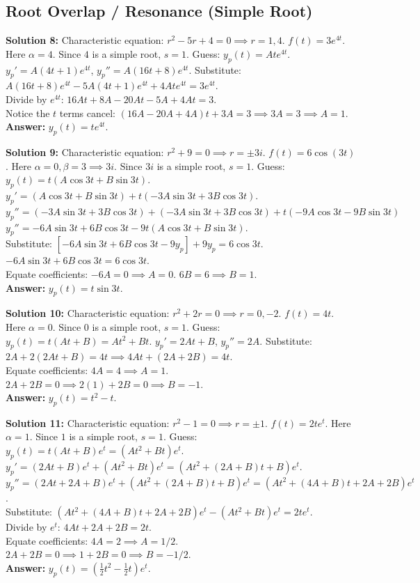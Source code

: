\documentclass[11pt]{article}
\begin{document}
\subsection*{Root Overlap / Resonance (Simple Root)}

\textbf{Solution 8:} 
Characteristic equation: $r^2 - 5r + 4 = 0 \implies r = 1, 4$. 
$f(t) = 3e^{4t}$. Here $\alpha=4$. Since $4$ is a simple root, $s=1$. 
Guess: $y_p(t) = Ate^{4t}$. 
$y_p' = A(4t+1)e^{4t}$, $y_p'' = A(16t+8)e^{4t}$. 
Substitute: $A(16t+8)e^{4t} - 5A(4t+1)e^{4t} + 4Ate^{4t} = 3e^{4t}$. \\
Divide by $e^{4t}$: $16At + 8A - 20At - 5A + 4At = 3$. \\
Notice the $t$ terms cancel: $(16A - 20A + 4A)t + 3A = 3 \implies 3A = 3 \implies A = 1$. \\
\textbf{Answer:} $y_p(t) = te^{4t}$.

\textbf{Solution 9:} 
Characteristic equation: $r^2 + 9 = 0 \implies r = \pm 3i$. 
$f(t) = 6\cos(3t)$. Here $\alpha=0, \beta=3 \implies 3i$. Since $3i$ is a simple root, $s=1$. 
Guess: $y_p(t) = t(A\cos 3t + B\sin 3t)$. 
$y_p' = (A\cos 3t + B\sin 3t) + t(-3A\sin 3t + 3B\cos 3t)$. \\
$y_p'' = (-3A\sin 3t + 3B\cos 3t) + (-3A\sin 3t + 3B\cos 3t) + t(-9A\cos 3t - 9B\sin 3t)$ \\
$y_p'' = -6A\sin 3t + 6B\cos 3t - 9t(A\cos 3t + B\sin 3t)$. \\
Substitute: $[-6A\sin 3t + 6B\cos 3t - 9y_p] + 9y_p = 6\cos 3t$. \\
$-6A\sin 3t + 6B\cos 3t = 6\cos 3t$. \\
Equate coefficients: $-6A = 0 \implies A = 0$. $6B = 6 \implies B = 1$. \\
\textbf{Answer:} $y_p(t) = t\sin 3t$.

\textbf{Solution 10:} 
Characteristic equation: $r^2 + 2r = 0 \implies r = 0, -2$. 
$f(t) = 4t$. Here $\alpha=0$. Since $0$ is a simple root, $s=1$. 
Guess: $y_p(t) = t(At + B) = At^2 + Bt$. 
$y_p' = 2At + B$, $y_p'' = 2A$. 
Substitute: $2A + 2(2At + B) = 4t \implies 4At + (2A + 2B) = 4t$. \\
Equate coefficients: $4A = 4 \implies A = 1$. \\
$2A + 2B = 0 \implies 2(1) + 2B = 0 \implies B = -1$. \\
\textbf{Answer:} $y_p(t) = t^2 - t$.

\textbf{Solution 11:} 
Characteristic equation: $r^2 - 1 = 0 \implies r = \pm 1$. 
$f(t) = 2te^t$. Here $\alpha=1$. Since $1$ is a simple root, $s=1$. 
Guess: $y_p(t) = t(At + B)e^t = (At^2 + Bt)e^t$. 
$y_p' = (2At + B)e^t + (At^2 + Bt)e^t = (At^2 + (2A+B)t + B)e^t$. \\
$y_p'' = (2At + 2A + B)e^t + (At^2 + (2A+B)t + B)e^t = (At^2 + (4A+B)t + 2A + 2B)e^t$. \\
Substitute: $(At^2 + (4A+B)t + 2A + 2B)e^t - (At^2 + Bt)e^t = 2te^t$. \\
Divide by $e^t$: $4At + 2A + 2B = 2t$. \\
Equate coefficients: $4A = 2 \implies A = 1/2$. \\
$2A + 2B = 0 \implies 1 + 2B = 0 \implies B = -1/2$. \\
\textbf{Answer:} $y_p(t) = (\frac{1}{2}t^2 - \frac{1}{2}t)e^t$.
\end{document}
